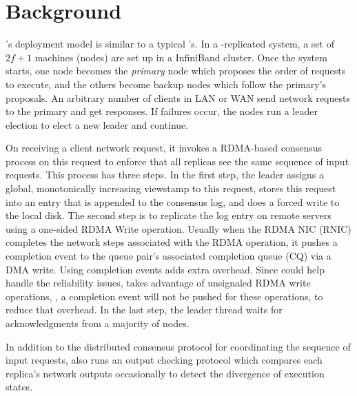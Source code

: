 \section{\smrsystem Background} \label{sec:background}

\smrsystem's deployment model is similar to a typical \smr's. In a \smrsystem-replicated 
system, a set of $2f+1$ machines (nodes) are set up in a InfiniBand cluster. Once the 
\smrsystem system starts, one node becomes the \emph{primary} node which proposes the order of 
requests to execute, and the others become backup nodes which follow the primary’s 
proposals. An arbitrary number of clients in LAN or WAN send network requests to the 
primary and get responses. If failures occur, the nodes run a leader election to elect 
a new leader and continue.

On receiving a client network request, it invokes a RDMA-based consensus process on this 
request to enforce that all replicas see the same sequence of input requests. This process 
has three steps. In the first step, the leader assigns a global, monotonically increasing 
viewstamp to this request, stores this request into an entry that is appended to the consensus 
log, and does a forced write to the local disk. The second step is to replicate the log entry 
on remote servers using a one-sided RDMA Write operation. Usually when the RDMA NIC (RNIC) 
completes the network steps associated with the RDMA operation, it pushes a completion event 
to the queue pair's associated completion queue (CQ) via a DMA write. Using completion events 
adds extra overhead. Since \paxos could help handle the reliability issues, \smrsystem takes 
advantage of unsignaled RDMA write operations, \ie, a completion event will not be pushed for 
these operations, to reduce that overhead. In the last step, the leader thread waits for 
acknowledgments from a majority of nodes.

In addition to the distributed consensus protocol for coordinating the sequence of input requests, 
\smrsystem also runs an output checking protocol which compares each replica's network outputs 
occasionally to detect the divergence of execution states.
